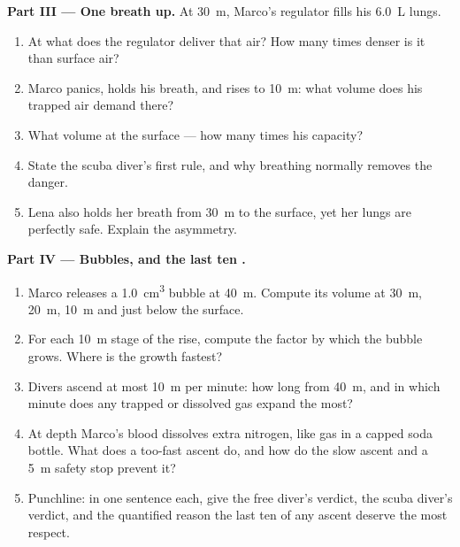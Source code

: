 \begin{problem}
\medskip
\noindent\textbf{Part III --- One breath up.}
At \qty{30}{m}, Marco's regulator fills his \qty{6.0}{L} lungs.
\begin{enumerate}[resume]
  \item At what  does the regulator deliver that air? How
        many times denser is it than surface air?
  \item Marco panics, holds his breath, and rises to \qty{10}{m}:
        what volume does his trapped air demand there?
  \item What volume at the surface --- how many times his capacity?
  \item State the scuba diver's first rule, and why breathing
        normally removes the danger.
  \item Lena also holds her breath from \qty{30}{m} to the surface,
        yet her lungs are perfectly safe. Explain the asymmetry.
\end{enumerate}

\medskip
\noindent\textbf{Part IV --- Bubbles, and the last ten .}
\begin{enumerate}[resume]
  \item Marco releases a \qty{1.0}{cm^3} bubble at \qty{40}{m}.
        Compute its volume at \qty{30}{m}, \qty{20}{m}, \qty{10}{m}
        and just below the surface.
  \item For each \qty{10}{m} stage of the rise, compute the factor by
        which the bubble grows. Where is the growth fastest?
  \item Divers ascend at most \qty{10}{m} per minute: how long from
        \qty{40}{m}, and in which minute does any trapped or dissolved
        gas expand the most?
  \item At depth Marco's blood dissolves extra nitrogen, like gas in
        a capped soda bottle. What does a too-fast ascent do, and how
        do the slow ascent and a \qty{5}{m} safety stop prevent it?
  \item Punchline: in one sentence each, give the free diver's
        verdict, the scuba diver's verdict, and the quantified reason
        the last ten  of any ascent deserve the most respect.
\end{enumerate}
\end{problem}
